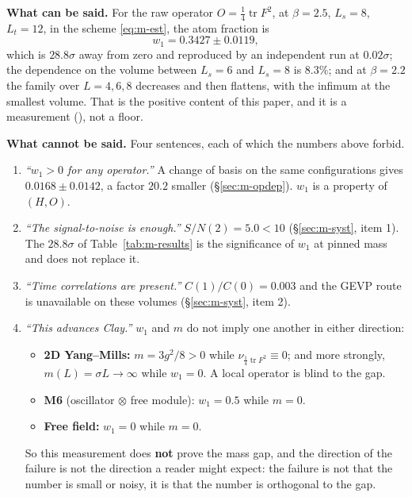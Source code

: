 \begin{v3box}
\textbf{What can be said.} For the raw operator $O=\tfrac14\operatorname{tr}F^2$, at $\beta=2.5$,
$L_s=8$, $L_t=12$, in the scheme \eqref{eq:m-est}, the atom fraction is
\[
w_1=0.3427\pm0.0119 ,
\]
which is $28.8\sigma$ away from zero and reproduced by an independent run at $0.02\sigma$; the
dependence on the volume between $L_s=6$ and $L_s=8$ is $8.3\%$; and at $\beta=2.2$ the family over
$L=4,6,8$ decreases and then flattens, with the infimum at the smallest volume. That is the positive
content of this paper, and it is a measurement (\LE{}), not a floor.
\end{v3box}

\begin{warnbox}
\textbf{What cannot be said.} Four sentences, each of which the numbers above forbid.
\begin{enumerate}[label=\textbf{(\roman*)},leftmargin=2.3em]
\item \emph{``$w_1>0$ for any operator.''} A change of basis on the same configurations gives
  $0.0168\pm0.0142$, a factor $20.2$ smaller (\S\ref{sec:m-opdep}). $w_1$ is a property of $(H,O)$.
\item \emph{``The signal-to-noise is enough.''} $S/N(2)=5.0<10$ (\S\ref{sec:m-syst}, item 1). The
  $28.8\sigma$ of Table~\ref{tab:m-results} is the significance of $w_1$ at pinned mass and does not
  replace it.
\item \emph{``Time correlations are present.''} $C(1)/C(0)=0.003$ and the GEVP route is unavailable
  on these volumes (\S\ref{sec:m-syst}, item 2).
\item \emph{``This advances Clay.''} $w_1$ and $m$ do not imply one another in either direction:
  \begin{itemize}
  \item \textbf{2D Yang--Mills:} $m=3g^2/8>0$ while $\nu_{\frac14\operatorname{tr}F^2}\equiv0$; and
    more strongly, $m(L)=\sigma L\to\infty$ while $w_1=0$. A local operator is blind to the gap.
  \item \textbf{M6} (oscillator $\otimes$ free module): $w_1=0.5$ while $m=0$.
  \item \textbf{Free field:} $w_1=0$ while $m=0$.
  \end{itemize}
  So this measurement does \textbf{not} prove the mass gap, and the direction of the failure is not
  the direction a reader might expect: the failure is not that the number is small or noisy, it is
  that the number is orthogonal to the gap.
\end{enumerate}
\end{warnbox}

